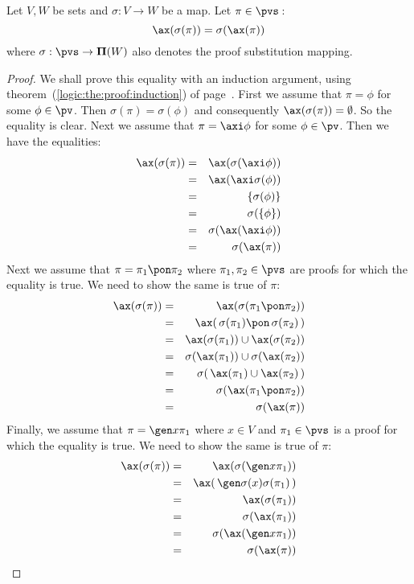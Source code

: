 \begin{prop}\label{logic:prop:FUAP:axiomset:substitution}
Let $V, W$ be sets and $\sigma:V\to W$ be a map. Let $\pi\in\pvs$\,:
    \[
    \ax(\sigma(\pi))=\sigma(\ax(\pi))
    \]
where $\sigma:\pvs\to{\bf\Pi}(W)$ also denotes the proof
substitution mapping.
\end{prop}
\begin{proof}
We shall prove this equality with an induction argument, using
theorem~(\ref{logic:the:proof:induction}) of
page~\pageref{logic:the:proof:induction}. First we assume that
$\pi=\phi$ for some $\phi\in\pv$. Then $\sigma(\pi)=\sigma(\phi)$
and consequently $\ax(\sigma(\pi))=\emptyset$. So the equality is
clear. Next we assume that $\pi=\axi\phi$ for some $\phi\in\pv$.
Then we have the equalities:
    \begin{eqnarray*}
    \ax(\sigma(\pi))&=&\ax(\sigma(\axi\phi))\\
    &=&\ax(\axi\sigma(\phi))\\
    &=&\{\sigma(\phi)\}\\
    &=&\sigma(\{\phi\})\\
    &=&\sigma(\ax(\axi\phi))\\
    &=&\sigma(\ax(\pi))
    \end{eqnarray*}
Next we assume that $\pi=\pi_{1}\pon\pi_{2}$ where
$\pi_{1},\pi_{2}\in\pvs$ are proofs for which the equality is true.
We need to show the same is true of $\pi$:
    \begin{eqnarray*}
    \ax(\sigma(\pi))&=&\ax(\sigma(\pi_{1}\pon\pi_{2}))\\
    &=&\ax(\,\sigma(\pi_{1})\pon\,\sigma(\pi_{2})\,)\\
    &=&\ax(\sigma(\pi_{1}))\cup\ax(\sigma(\pi_{2}))\\
    &=&\sigma(\ax(\pi_{1}))\cup\sigma(\ax(\pi_{2}))\\
    &=&\sigma(\,\ax(\pi_{1})\cup\ax(\pi_{2})\,)\\
    &=&\sigma(\ax(\pi_{1}\pon\pi_{2}))\\
    &=&\sigma(\ax(\pi))\\
    \end{eqnarray*}
Finally, we assume that $\pi=\gen x\pi_{1}$ where $x\in V$ and
$\pi_{1}\in\pvs$ is a proof for which the equality is true. We need
to show the same is true of $\pi$:
    \begin{eqnarray*}
    \ax(\sigma(\pi))&=&\ax(\sigma(\gen x\pi_{1}))\\
    &=&\ax(\,\gen\sigma(x)\sigma(\pi_{1})\,)\\
    &=&\ax(\sigma(\pi_{1}))\\
    &=&\sigma(\ax(\pi_{1}))\\
    &=&\sigma(\ax(\gen x\pi_{1}))\\
    &=&\sigma(\ax(\pi))
    \end{eqnarray*}
\end{proof}
